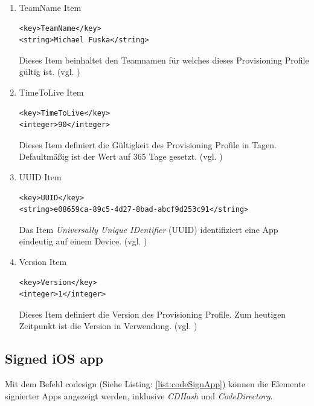 \begin{enumerate}
    \item TeamName Item
\begin{lstlisting}[captionpos=b, caption={TeamName Item}]
<key>TeamName</key>
<string>Michael Fuska</string>
\end{lstlisting}
 Dieses Item beinhaltet den Teamnamen für welches dieses Provisioning Profile gültig ist. (vgl. \cite{iOSSec[5], Hacking[1]})

   \item TimeToLive Item
\begin{lstlisting}[captionpos=b, caption={TimeToLive Item}]
<key>TimeToLive</key>
<integer>90</integer>
\end{lstlisting}
Dieses Item definiert die Gültigkeit des Provisioning Profile in Tagen. Defaultmäßig ist der Wert auf 365 Tage gesetzt. (vgl. \cite{iOSSec[5], Hacking[1]})
 
    \item UUID Item
\begin{lstlisting}[captionpos=b, caption={UUID Item}]
<key>UUID</key>
<string>e08659ca-89c5-4d27-8bad-abcf9d253c91</string>
\end{lstlisting}
Das Item \textit{\glqq Universally Unique IDentifier\grqq{}} (UUID) identifiziert eine App eindeutig auf einem Device. (vgl. \cite{iOSSec[5], Hacking[1]})

    \item Version Item
\begin{lstlisting}[captionpos=b, caption={Version Item}]
<key>Version</key>
<integer>1</integer> 
\end{lstlisting}
Dieses Item definiert die Version des Provisioning Profile. Zum heutigen Zeitpunkt ist die Version \textit{\grqq{}} in Verwendung. (vgl. \cite{iOSSec[5], Hacking[1]})
\end{enumerate}

\subsection{Signed iOS app}
\label{sec:SignediOSApp}
Mit dem Befehl \glqq codesign\grqq{} (Siehe Listing: \ref{list:codeSignApp}) können die Elemente signierter Apps angezeigt werden, inklusive \textit{\glqq CDHash\grqq{}} und \textit{\glqq CodeDirectory\grqq}.
\newline

